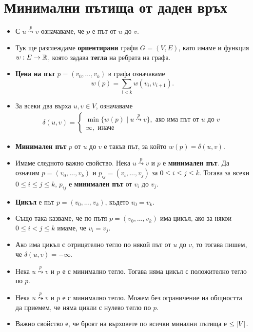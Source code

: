 \section{Минимални пътища от даден връх}

\begin{itemize}
\item
  С $u \stackrel{p}{\leadsto} v$ означаваме, че $p$ е път от $u$ до $v$.
\item
  Тук ще разглеждаме {\bf ориентирани} графи $G = (V,E)$, като имаме и 
  функция $w: E\to \mathbb{R}$, която задава {\bf тегла} на ребрата на графа.
\item 
  {\bf Цена на път} $p = (v_0,\dots,v_k)$ в графа означаваме 
  \[w(p) = \sum_{i<k} w(v_i,v_{i+1}).\]
\item
  За всеки два върха $u,v \in V$, означаваме
  \begin{align*}
    \delta(u,v) = 
    \begin{cases}
      \min\{w(p)\mid u \stackrel{p}{\leadsto} v\}, \mbox{ ако има път от }u\mbox{ до }v\\
      \infty, \mbox{ иначе }
    \end{cases}
  \end{align*}
\item
  {\bf Минимален път} $p$ от $u$ до $v$ е такъв път, за който $w(p) = \delta(u,v)$.
\item
  Имаме следното важно свойство.
  Нека $u \stackrel{p}{\leadsto} v$ и $p$ е {\bf минимален път}.
  Да означим $p = (v_0,\dots,v_k)$ и $p_{ij} = (v_i,\dots,v_j)$ за $0\leq i \leq j \leq k$.
  Тогава за всеки $0\leq i \leq j \leq k$, 
  $p_{ij}$ е {\bf минимален път} от $v_i$ до $v_j$.
\item
  {\bf Цикъл} е път $p = (v_0,\dots,v_k)$, където $v_0 = v_k$.
\item
  Също така казваме, че по пътя $p = (v_0,\dots,v_k)$ има цикъл, ако
  за някои $0 \leq i < j \leq k$ имаме, че $v_i = v_j$.
\item
  Ако има цикъл с отрицателно тегло по някой път от $u$ до $v$, то 
  тогава пишем, че $\delta(u,v) = -\infty$.
\item
  Нека $u \stackrel{p}{\leadsto} v$ и $p$ е с минимално тегло.
  Тогава няма цикъл с положително тегло по $p$.
\item
  Нека $u \stackrel{p}{\leadsto} v$ и $p$ е с минимално тегло.
  Можем без ограничение на общността да приемем, че няма цикли с нулево тегло
  по $p$.
\item
  Важно свойство е, че броят на върховете по всички минални пътища е $\leq \lvert{V}\rvert$.
\end{itemize}

